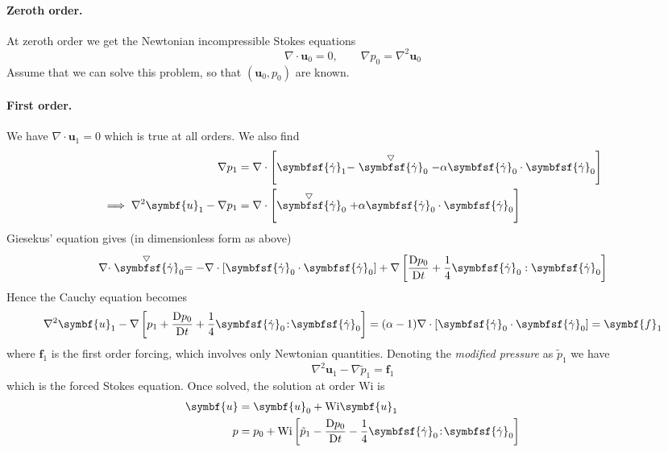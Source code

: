 \documentclass{jknotes}
\newcommand{\ucd}[1]{\stackrel{\bigtriangledown}{#1}}
\begin{document}
\paragraph{Zeroth order.} At zeroth order we get 
the Newtonian incompressible Stokes equations
\begin{equation}
	\nabla \cdot \symbf{u}_0 = 0, \hspace{2em} \nabla p_0 = \nabla^2
	\symbf{u}_0
\end{equation}
Assume that we can solve this problem, so that $(\symbf{u}_0,p_0)$ are known.
\paragraph{First order.} We have $\nabla \cdot \symbf{u}_1 = 0$ which is true
at all orders. We also find
\begin{align}
	\nabla p_1 &= \nabla \cdot \left[ \symbfsf{\srate}_1 -
		\ucd{\symbfsf{\srate}}_0 - \alpha
	\symbfsf{\srate}_0\cdot\symbfsf{\srate}_0 \right] \\
	\implies \nabla^2 \symbf{u}_1 - \nabla p_1 &= \nabla \cdot \left[
		\ucd{\symbfsf{\srate}}_0 + \alpha
	\symbfsf{\srate}_0\cdot\symbfsf{\srate}_0\right]
\end{align}
Giesekus' equation gives (in dimensionless form as above)
\begin{equation}
	\nabla \cdot \ucd{\symbfsf{\srate}}_0 = -\nabla \cdot \left[
		\symbfsf{\srate}_0 \cdot \symbfsf{\srate}_0\right] + \nabla\left[
		\frac{\diffD p_0}{\diffD t} +
	\frac{1}{4}\symbfsf{\srate}_0:\symbfsf{\srate}_0\right]
\end{equation}
Hence the Cauchy equation becomes
\begin{equation}
	\nabla^2 \symbf{u}_1 - \nabla \left[ p_1 + \frac{\diffD p_0}{\diffD t} +
	\frac{1}{4}\symbfsf{\srate}_0\!:\!\symbfsf{\srate}_0\right] =
	(\alpha-1)\nabla \cdot \left[
	\symbfsf{\srate}_0\cdot\symbfsf{\srate}_0\right] = \symbf{f}_1
\end{equation}
where $\symbf{f}_1$ is the first order forcing, which involves only Newtonian
quantities. Denoting the \emph{modified pressure} as $\tilde{p}_1$ we have
\begin{equation}
	\nabla^2 \symbf{u}_1 - \nabla \tilde{p}_1 = \symbf{f}_1
\end{equation}
which is the forced Stokes equation. Once solved, the solution at order
$\text{Wi}$ is
\begin{align}
	\symbf{u} &= \symbf{u}_0 + \text{Wi}\symbf{u}_1 \\
	p &= p_0 + \text{Wi}\left[ \tilde{p}_1 - \frac{\diffD p_0}{\diffD t} -
	\frac{1}{4}\symbfsf{\srate}_0\!:\!\symbfsf{\srate}_0\right]
\end{align}
\end{document}
